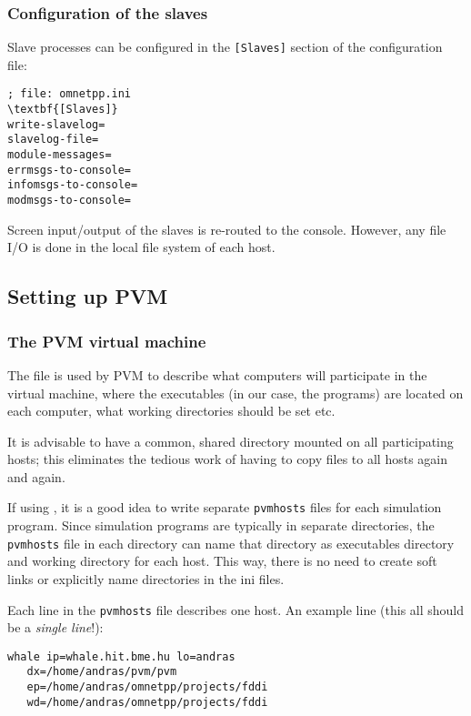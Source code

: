 \subsubsection{Configuration of the slaves}

Slave processes can be configured in the \texttt{[Slaves]} section of
the configuration file:

\begin{Verbatim}[commandchars=\\\{\}]
; file: omnetpp.ini
\textbf{[Slaves]}
write-slavelog=
slavelog-file=
module-messages=
errmsgs-to-console=
infomsgs-to-console=
modmsgs-to-console=
\end{Verbatim}

Screen input/output of the slaves is re-routed to the console.
However, any file I/O is done in the local file system of each host.



\subsection{Setting up PVM}

\subsubsection{The PVM virtual machine}


The  file is used by PVM to describe what computers will
participate in the virtual machine, where the executables (in our
case, the {\opp} programs) are located on each computer, what working
directories should be set etc.


It is advisable to have a common, shared directory mounted on all
participating hosts; this eliminates the tedious work of having to
copy files to all hosts again and again.


If using {\opp}, it is a good idea to write separate \texttt{pvmhosts}
files for each simulation program. Since simulation programs are
typically in separate directories, the \texttt{pvmhosts} file in each
directory can name that directory as executables directory and working
directory for each host. This way, there is no need to create soft
links or explicitly name directories in the {\opp} ini files.


Each line in the \texttt{pvmhosts} file describes one host. An example
line (this all should be a \textit{single line}!):

\begin{Verbatim}
whale ip=whale.hit.bme.hu lo=andras
   dx=/home/andras/pvm/pvm
   ep=/home/andras/omnetpp/projects/fddi
   wd=/home/andras/omnetpp/projects/fddi
\end{Verbatim}

